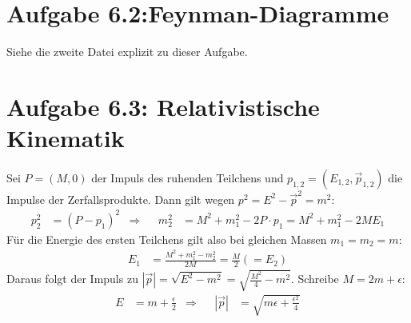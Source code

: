 \documentclass[a4paper,12pt]{article}
\newcommand{\kla}{}
\begin{document}
\section*{Aufgabe 6.2:Feynman-Diagramme}
Siehe die zweite Datei explizit zu dieser Aufgabe.
\section*{Aufgabe 6.3: Relativistische Kinematik}
Sei $P=(M,0)$ der Impuls des ruhenden Teilchens und $p_{1,2}=(E_{1,2},\vec{p}_{1,2})$ die Impulse der Zerfallsprodukte. Dann gilt wegen $p^2=E^2-\vec{p}^2=m^2$:
\begin{align*}
p_2^2&=(P-p_1)^2&\Rightarrow &&m_2^2&=M^2+m_1^2-2P\cdot p_1=M^2+m_1^2-2ME_1
\end{align*}
Für die Energie des ersten Teilchens gilt also bei gleichen Massen $m_1=m_2=m$:
\begin{align*}
E_1&=\frac{M^2+m_1^2-m_2^2}{2M}=\frac{M}{2}\kla\left( {=E_2} \right)
\end{align*}
Daraus folgt der Impuls zu $|\vec{p}|=\sqrt{E^2-m^2}=\sqrt{\frac{M^2}{4}-m^2}$. Schreibe $M=2m+\epsilon$:
\begin{align*}
E&=m+\frac{\epsilon}{2}&\Rightarrow &&|\vec{p}|&=\sqrt{m\epsilon+\frac{\epsilon^2}{4}}
\end{align*}
\end{document}
